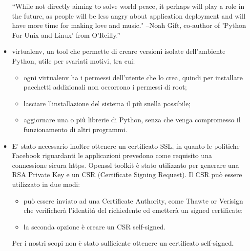 \begin{itemize}
“While not directly aiming to solve world peace, it perhaps will play a role in the future, as people will be less angry about application deployment and will have more time for making love and music." --Noah Gift, co-author of 'Python For Unix and Linux' from O'Reilly.”
\item virtualenv, un tool che permette di creare versioni isolate dell'ambiente Python, utile per svariati motivi, tra cui:
	\begin{itemize}
	\item ogni virtualenv ha i permessi dell’utente che lo crea, quindi per installare pacchetti addizionali non occorrono i permessi di root;
	\item lasciare l’installazione del sistema il più snella possibile;
	\item aggiornare una o più librerie di Python, senza che venga compromesso il funzionamento di altri programmi.
	\end{itemize}
\item E' stato necessario inoltre ottenere un certificato SSL, in quanto le politiche Facebook riguardanti le applicazioni prevedono come requisito una connessione sicura https. Openssl toolkit è stato utilizzato per generare una RSA Private Key e un CSR (Certificate Signing Request).  Il CSR può essere utilizzato in due modi: 
	\begin{itemize}
	\item può essere inviato ad una Certificate Authority, come Thawte or Verisign che verificherà l'identità del  richiedente ed emetterà un signed certificate;
	\item la seconda opzione è creare un CSR self-signed.
	\end{itemize}
Per i nostri scopi non è stato sufficiente ottenere un certificato self-signed.
\end{itemize}
\endinput